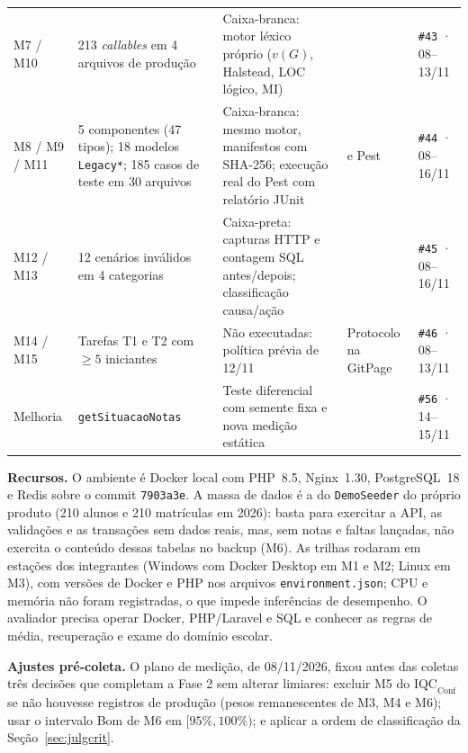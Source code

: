 \documentclass[conference]{model/IEEEtran}%
\begin{document}
\begin{table}[!t]
\begin{tabular}{@{}L{1.25cm}L{4.15cm}L{5.25cm}L{4.4cm}L{1.85cm}@{}}
M7 / M10 & 213 \textit{callables} em 4 arquivos de produção & Caixa-branca: motor léxico próprio ($v(G)$, Halstead, LOC lógico, MI) &  & \texttt{\#43} · 08--13/11 \\
M8 / M9 / M11 & 5 componentes (47 tipos); 18 modelos \texttt{Legacy*}; 185 casos de teste em 30 arquivos & Caixa-branca: mesmo motor, manifestos com SHA-256; execução real do Pest com relatório JUnit &  e Pest & \texttt{\#44} · 08--16/11 \\
M12 / M13 & 12 cenários inválidos em 4 categorias & Caixa-preta: capturas HTTP e contagem SQL antes/depois; classificação causa/ação &  & \texttt{\#45} · 08--16/11 \\
M14 / M15 & Tarefas T1 e T2 com $\ge 5$ iniciantes & Não executadas: política prévia de 12/11 & Protocolo na GitPage & \texttt{\#46} · 08--13/11 \\
Melhoria & \texttt{getSituacaoNotas} & Teste diferencial com semente fixa e nova medição estática &  & \texttt{\#56} · 14--15/11 \\
\bottomrule
\end{tabular}
\end{table}

\textbf{Recursos.} O ambiente é Docker local com PHP~8.5, Nginx~1.30, PostgreSQL~18 e Redis sobre o commit \texttt{7903a3e}. A massa de dados é a do \texttt{DemoSeeder} do próprio produto (210 alunos e 210 matrículas em 2026): basta para exercitar a API, as validações e as transações sem dados reais, mas, sem notas e faltas lançadas, não exercita o conteúdo dessas tabelas no backup (M6). As trilhas rodaram em estações dos integrantes (Windows com Docker Desktop em M1 e M2; Linux em M3), com versões de Docker e PHP nos arquivos \texttt{environment.json}; CPU e memória não foram registradas, o que impede inferências de desempenho. O avaliador precisa operar Docker, PHP/Laravel e SQL e conhecer as regras de média, recuperação e exame do domínio escolar.

\textbf{Ajustes pré-coleta.} O plano de medição, de 08/11/2026, fixou antes das coletas três decisões que completam a Fase 2 sem alterar limiares: excluir M5 do $\text{IQC}_{\text{Conf}}$ se não houvesse registros de produção (pesos remanescentes de M3, M4 e M6); usar o intervalo Bom de M6 em $[95\%, 100\%)$; e aplicar a ordem de classificação da Seção~\ref{sec:julgcrit}.
\end{document}

